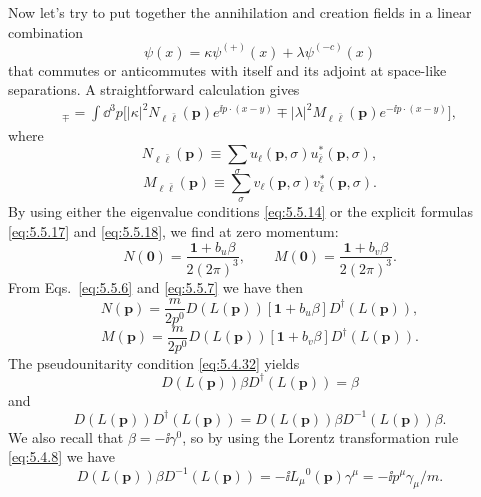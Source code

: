 Now let's try to put together the annihilation and creation fields in a linear
combination
\begin{equation}
\psi(x)=\kappa\psi^{(+)}(x)+\lambda\psi^{(-c)}(x)
\tag{5.5.19}\label{eq:5.5.19}
\end{equation}
that commutes or anticommutes with itself and its adjoint at space-like
separations. A straightforward calculation gives
\begin{align}
[\psi_\ell(x),\psi_{\bar\ell}^\dagger(y)]_\mp
=\int \dd^3p\bigl[|\kappa|^2N_{\ell\bar\ell}(\mathbf p)e^{\ii p\cdot(x-y)}
\mp|\lambda|^2M_{\ell\bar\ell}(\mathbf p)e^{-\ii p\cdot(x-y)}\bigr],
\tag{5.5.20}\label{eq:5.5.20}
\end{align}
where
\begin{equation}
N_{\ell\bar\ell}(\mathbf p)\equiv
\sum_\sigma u_\ell(\mathbf p,\sigma)u_{\bar\ell}^*(\mathbf p,\sigma),
\tag{5.5.21}\label{eq:5.5.21}
\end{equation}
\begin{equation}
M_{\ell\bar\ell}(\mathbf p)\equiv
\sum_\sigma v_\ell(\mathbf p,\sigma)v_{\bar\ell}^*(\mathbf p,\sigma).
\tag{5.5.22}\label{eq:5.5.22}
\end{equation}
By using either the eigenvalue conditions \eqref{eq:5.5.14} or the explicit formulas
\eqref{eq:5.5.17} and \eqref{eq:5.5.18}, we find at zero momentum:
\begin{equation}
N(\mathbf0)=\frac{\mathbf{1}+b_u\beta}{2(2\pi)^3},
\qquad
M(\mathbf0)=\frac{\mathbf{1}+b_v\beta}{2(2\pi)^3}.
\tag{5.5.23}\label{eq:5.5.23}
\end{equation}
From Eqs.~\eqref{eq:5.5.6} and \eqref{eq:5.5.7} we have then
\begin{equation}
N(\mathbf p)=\frac{m}{2p^0}D(L(\mathbf p))
[\mathbf{1}+b_u\beta]D^\dagger(L(\mathbf p)),
\tag{5.5.24}\label{eq:5.5.24}
\end{equation}
\begin{equation}
M(\mathbf p)=\frac{m}{2p^0}D(L(\mathbf p))
[\mathbf{1}+b_v\beta]D^\dagger(L(\mathbf p)).
\tag{5.5.25}\label{eq:5.5.25}
\end{equation}
The pseudounitarity condition \eqref{eq:5.4.32} yields
\[
D(L(\mathbf p))\beta D^\dagger(L(\mathbf p))=\beta
\]
and
\[
D(L(\mathbf p))D^\dagger(L(\mathbf p))
=D(L(\mathbf p))\beta D^{-1}(L(\mathbf p))\beta.
\]
We also recall that $\beta=-\ii\gamma^0$, so by using the Lorentz transformation
rule \eqref{eq:5.4.8} we have
\begin{equation}
D(L(\mathbf p))\beta D^{-1}(L(\mathbf p))
=-\ii L_\mu{}^0(\mathbf p)\gamma^\mu=-\ii p^\mu\gamma_\mu/m.
\tag{5.5.26}\label{eq:5.5.26}
\end{equation}

